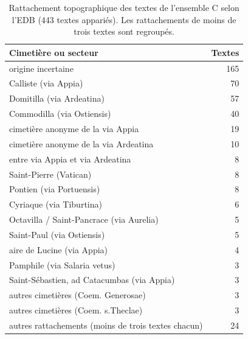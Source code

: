 \begin{table}[tbp]\centering\small\caption{Rattachement topographique des textes de l’ensemble C selon l’EDB (443 textes appariés). Les rattachements de moins de trois textes sont regroupés.}\label{tab:cimetieres}
\begin{tabular}{@{}l r@{}}\toprule Cimetière ou secteur & Textes\\\midrule
origine incertaine & 165 \\
Calliste (via Appia) & 70 \\
Domitilla (via Ardeatina) & 57 \\
Commodilla (via Ostiensis) & 40 \\
cimetière anonyme de la via Appia & 19 \\
cimetière anonyme de la via Ardeatina & 10 \\
entre via Appia et via Ardeatina & 8 \\
Saint-Pierre (Vatican) & 8 \\
Pontien (via Portuensis) & 8 \\
Cyriaque (via Tiburtina) & 6 \\
Octavilla / Saint-Pancrace (via Aurelia) & 5 \\
Saint-Paul (via Ostiensis) & 5 \\
aire de Lucine (via Appia) & 4 \\
Pamphile (via Salaria vetus) & 3 \\
Saint-Sébastien, ad Catacumbas (via Appia) & 3 \\
autres cimetières (Coem. Generosae) & 3 \\
autres cimetières (Coem. s.Theclae) & 3 \\
autres rattachements (moins de trois textes chacun) & 24 \\
\bottomrule\end{tabular}\end{table}
